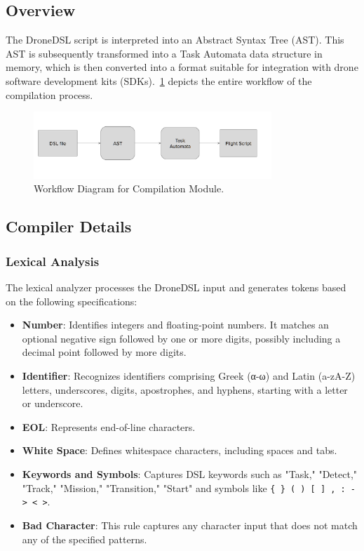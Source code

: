 \subsection{Overview}
The DroneDSL script is interpreted into an Abstract Syntax Tree (AST). This AST is subsequently transformed into a Task Automata data structure in memory, which is then converted into a format suitable for integration with drone software development kits (SDKs).~\ref{fig:cli_flow} depicts the entire workflow of the compilation process.
\begin{figure}[H] %
    \centering %
    \includegraphics[width=0.8\textwidth]{Pictures/cli_flow.PNG}
    \caption{Workflow Diagram for Compilation Module.}
    \label{fig:cli_flow}
\end{figure}
\subsection{Compiler Details}
\subsubsection{Lexical Analysis}
The lexical analyzer processes the DroneDSL input and generates tokens based on the following specifications:
\begin{itemize}
    \item \textbf{Number}: Identifies integers and floating-point numbers. It matches an optional negative sign followed by one or more digits, possibly including a decimal point followed by more digits.
    \item \textbf{Identifier}: Recognizes identifiers comprising Greek (\textgreek{α}-\textgreek{ω}) and Latin (a-zA-Z) letters, underscores, digits, apostrophes, and hyphens, starting with a letter or underscore.
    \item \textbf{EOL}: Represents end-of-line characters.
    \item \textbf{White Space}: Defines whitespace characters, including spaces and tabs.
    \item \textbf{Keywords and Symbols}: Captures DSL keywords such as "Task," "Detect," "Track," "Mission," "Transition," "Start" and symbols like \texttt{\{ \} ( ) [ ] , : -> < >}.
    \item \textbf{Bad Character}: This rule captures any character input that does not match any of the specified patterns.
\end{itemize}

